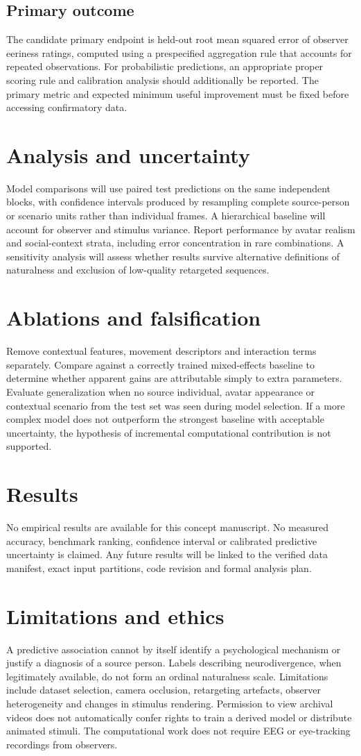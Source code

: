\documentclass[11pt,a4paper]{article}
\begin{document}
\subsection{Primary outcome}
The candidate primary endpoint is held-out root mean squared error of observer eeriness ratings, computed using a prespecified aggregation rule that accounts for repeated observations. For probabilistic predictions, an appropriate proper scoring rule and calibration analysis should additionally be reported. The primary metric and expected minimum useful improvement must be fixed before accessing confirmatory data.
\section{Analysis and uncertainty}
Model comparisons will use paired test predictions on the same independent blocks, with confidence intervals produced by resampling complete source-person or scenario units rather than individual frames. A hierarchical baseline will account for observer and stimulus variance. Report performance by avatar realism and social-context strata, including error concentration in rare combinations. A sensitivity analysis will assess whether results survive alternative definitions of naturalness and exclusion of low-quality retargeted sequences.
\section{Ablations and falsification}
Remove contextual features, movement descriptors and interaction terms separately. Compare against a correctly trained mixed-effects baseline to determine whether apparent gains are attributable simply to extra parameters. Evaluate generalization when no source individual, avatar appearance or contextual scenario from the test set was seen during model selection. If a more complex model does not outperform the strongest baseline with acceptable uncertainty, the hypothesis of incremental computational contribution is not supported.
\section{Results}
No empirical results are available for this concept manuscript. No measured accuracy, benchmark ranking, confidence interval or calibrated predictive uncertainty is claimed. Any future results will be linked to the verified data manifest, exact input partitions, code revision and formal analysis plan.
\section{Limitations and ethics}
A predictive association cannot by itself identify a psychological mechanism or justify a diagnosis of a source person. Labels describing neurodivergence, when legitimately available, do not form an ordinal naturalness scale. Limitations include dataset selection, camera occlusion, retargeting artefacts, observer heterogeneity and changes in stimulus rendering. Permission to view archival videos does not automatically confer rights to train a derived model or distribute animated stimuli. The computational work does not require EEG or eye-tracking recordings from observers.
\end{document}
